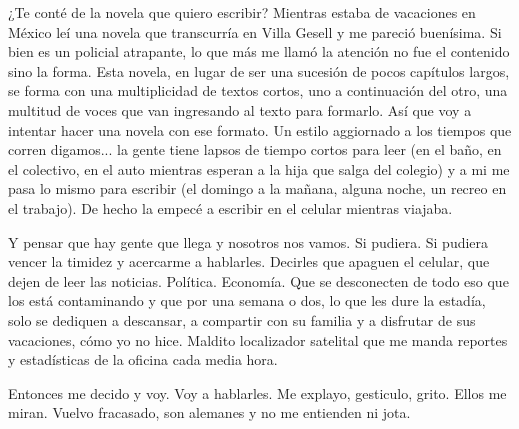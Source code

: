 \documentclass[11pt,twoside,openright,a6paper]{book}
\begin{document}
\vspace{0.5cm}
\hrulefill\hspace{0.2cm} \decofourleft\decofourright \hspace{0.2cm} \hrulefill
\vspace{0.5cm}

¿Te conté de la novela que quiero escribir? Mientras
estaba de vacaciones en México leí una novela que transcurría en Villa
Gesell y me pareció buenísima. Si bien es un policial atrapante, lo que
más me llamó la atención no fue el contenido sino la forma. Esta novela,
en lugar de ser una sucesión de pocos capítulos largos, se forma con una
multiplicidad de textos cortos, uno a continuación del otro, una multitud
de voces que van ingresando al texto para formarlo. Así que voy a intentar
hacer una novela con ese formato. Un estilo aggiornado a los tiempos que
corren digamos... la gente tiene lapsos de tiempo cortos para leer (en el
baño, en el colectivo, en el auto mientras esperan a la hija que salga del
colegio) y a mi me pasa lo mismo para escribir (el domingo a la mañana,
alguna noche, un recreo en el trabajo). De hecho la empecé a escribir en
el celular mientras viajaba.


\vspace{0.5cm}
\hrulefill\hspace{0.2cm} \decofourleft\decofourright \hspace{0.2cm} \hrulefill
\vspace{0.5cm}

Y pensar que hay gente que llega y nosotros
nos vamos. Si pudiera. Si pudiera vencer la timidez y acercarme
a hablarles. Decirles que apaguen el celular, que dejen de leer las
noticias. Política. Economía. Que se desconecten de todo eso que los está
contaminando y que por una semana o dos, lo que les dure la estadía, solo
se dediquen a descansar, a compartir con su familia y a disfrutar de sus
vacaciones, cómo yo no hice. Maldito localizador satelital que me manda
reportes y estadísticas de la oficina cada media hora.

Entonces me decido y voy. Voy a hablarles. Me explayo, gesticulo,
grito. Ellos me miran. Vuelvo fracasado, son alemanes y no me entienden
ni jota.


\vspace{0.5cm}
\hrulefill\hspace{0.2cm} \decofourleft\decofourright \hspace{0.2cm} \hrulefill
\vspace{0.5cm}
\end{document}
